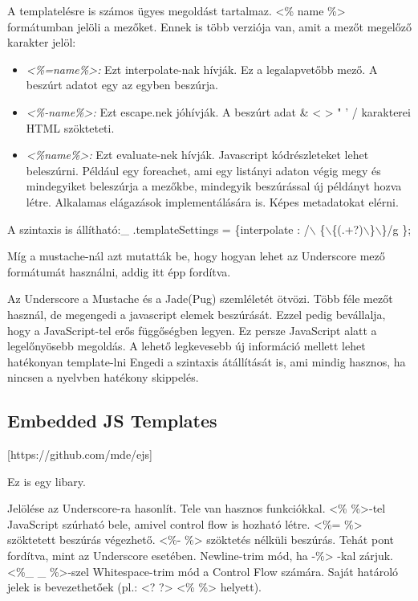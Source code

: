 A templatelésre is számos ügyes megoldást tartalmaz.
<\% name \%> formátumban jelöli a mezőket.
Ennek is több verziója van, amit a mezőt megelőző karakter jelöl:
\begin{itemize}
\item \emph{<\%=name\%>:}
Ezt interpolate-nak hívják. 
Ez a legalapvetőbb mező.
A beszúrt adatot egy az egyben beszúrja.
\item \emph{<\%-name\%>:}
Ezt escape.nek jóhívják.
A beszúrt adat \& < > " ' / karakterei HTML szökteteti.
\item \emph{<\%name\%>:}
Ezt evaluate-nek hívják.
Javascript kódrészleteket lehet beleszúrni.
Például egy foreachet, ami egy listányi adaton végig megy és mindegyiket beleszúrja a mezőkbe, mindegyik beszúrással új példányt hozva létre.
Alkalamas elágazások implementálására is.
Képes metadatokat elérni.
\end{itemize}

A szintaxis is állítható:\_ .templateSettings = \{interpolate : /$\backslash$ \{$\backslash$\{(.+?)$\backslash$\}$\backslash$\}/g \};

Míg a mustache-nál azt mutatták be, hogy hogyan lehet az Underscore mező formátumát használni, addig itt épp fordítva.

Az Underscore a Mustache és a Jade(Pug) szemléletét ötvözi.
Több féle mezőt használ, de megengedi a javascript elemek beszúrását.
Ezzel pedig bevállalja, hogy a JavaScript-tel erős függőségben legyen.
Ez persze JavaScript alatt a legelőnyösebb megoldás.
A lehető legkevesebb új információ mellett lehet hatékonyan template-lni
Engedi a szintaxis átállítását is, ami mindig hasznos, ha nincsen a nyelvben hatékony skippelés.

\subsection{Embedded JS Templates}
 [https://github.com/mde/ejs]

Ez is egy libary.

Jelölése az Underscore-ra hasonlít.
Tele van hasznos funkciókkal.
<\% \%>-tel JavaScript szúrható bele, amivel control flow is hozható létre.
<\%= \%> szöktetett beszúrás végezhető. 
<\%-  \%> szöktetés nélküli beszúrás.
Tehát pont fordítva, mint az Underscore esetében.
Newline-trim mód, ha -\%> -kal zárjuk.
<\%\_  \_ \%>-szel Whitespace-trim mód a Control Flow számára. 
Saját határoló jelek is bevezethetőek (pl.: <? ?> <\% \%> helyett).

